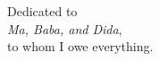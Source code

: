 \thispagestyle{empty}
{}

\vspace*{6cm}

\begin{center}
    Dedicated to \\
    \emph{Ma, Baba, and Dida},\\
    to whom I owe everything.
\end{center}

\medskip
